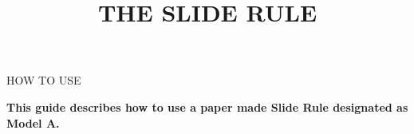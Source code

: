 
\newcommand{\makefulltitle}{How To Use The Slide Rule }



\title{\fontsize{60}{60}\selectfont THE SLIDE RULE}
\preauthor{}\postauthor{}\author{}
\predate{}\postdate{}\date{}


  \begin{center}
    \headingfont\fontsize{20}{20}\selectfont HOW TO USE
  \end{center}

  {\let\newpage\relax\maketitle}%
  \nosection{}
  \large\textbf{\makeperex This guide describes how to use a paper made Slide Rule designated as Model A.}


